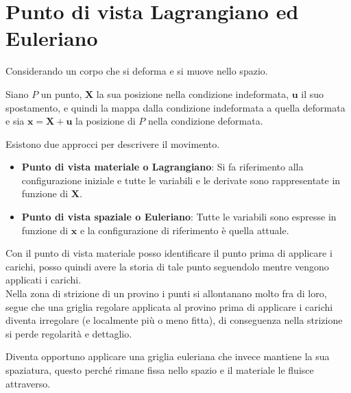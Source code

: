 \section{Punto di vista Lagrangiano ed Euleriano}

Considerando un corpo che si deforma e si muove nello spazio. 

Siano $P$ un punto, $\mathbf{X}$ la sua posizione nella condizione indeformata, $\mathbf{u}$ il suo spostamento, e quindi la mappa dalla condizione indeformata a quella deformata e sia $\mathbf{x} = \mathbf{X} +\mathbf{u}$ la posizione di $P$ nella condizione deformata.

Esistono due approcci per descrivere il movimento.

\begin{itemize}
    \item \textbf{Punto di vista materiale o Lagrangiano}: Si fa riferimento alla configurazione iniziale e tutte le variabili e le derivate sono rappresentate in funzione di $\mathbf{X}$.
    
    \item \textbf{Punto di vista spaziale o Euleriano}: Tutte le variabili sono espresse in funzione di $\mathbf{x}$ e la configurazione di riferimento è quella attuale.
\end{itemize}

Con il punto di vista materiale posso identificare il punto prima di applicare i carichi, posso quindi avere la storia di tale punto seguendolo mentre vengono applicati i carichi.\\

Nella zona di strizione di un provino i punti si allontanano molto fra di loro, segue che una griglia regolare applicata al provino prima di applicare i carichi diventa irregolare (e localmente più o meno fitta), di conseguenza nella strizione si perde regolarità e dettaglio.

Diventa opportuno applicare una griglia euleriana che invece mantiene la sua spaziatura, questo perché rimane fissa nello spazio e  il materiale le fluisce attraverso.